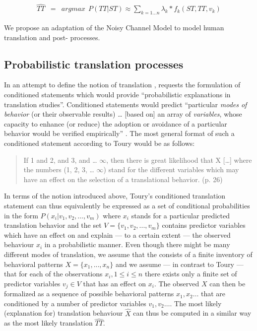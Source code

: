 \documentclass[output=paper]{LSP/langsci}
\begin{document}
\begin{eqnarray}
\label{carl-schaeffer:eqn:loglin}
\widehat {TT} & = & argmax~~P(TT|ST) \approx \sum_{k=1 \ldots n} \lambda_k * f_k(ST, TT,v_k) 
\end{eqnarray}

We propose an adaptation of the Noisy Channel Model to model human translation and post- processes. 

\subsection{Probabilistic translation processes}
\label{carl-schaeffer:sec:2.1}

In an attempt to define the notion of translation , \citet{Toury2004} requests the formulation of conditioned statements which would provide ``probabilistic explanations in translation studies''. Conditioned statements would predict ``particular \textit{modes of behavior }(or their observable results) {\dots} [based on] an array of \textit{variables}, whose capacity to enhance (or reduce) the adoption or avoidance of a particular behavior would be verified empirically'' \citep[24]{Toury2004}. The most general format of such a conditioned statement according to Toury would be as follows:

\begin{quote}
If 1 and 2, and 3, and {\dots} ${\infty}$, then there is great likelihood that X [\dots]
where the numbers (1, 2, 3, {\dots} ${\infty}$) stand for the different variables which may have an effect on the selection of a translational behavior. (p. 26)
\end{quote}

In terms of the notion introduced above, Toury's conditioned translation statement can thus equivalently be expressed as a set of conditional probabilities in the form  $P(x_i | v_1,v_2,{\dots},v_m)$ where $x_i$ stands for a particular predicted translation behavior and the set $V = \{v_1,v_2,...,v_m\}$ contains predictor variables which have an effect on and explain --- to a certain extent --- the observed behaviour $x_i$ in a probabilistic manner. Even though there might be many different modes of translation, we assume that the  consists of a finite inventory of behavioral patterns $X = \{x_1,...,x_n\}$ and we assume --- in contrast to Toury --- that for each of the observations $x_i,1{\leq}i{\leq}n$ there exists only a finite set of predictor variables  $v_j \in V$ that has an effect on  $x_i$. The observed   $X$ can then be formalized as a sequence of possible behavioral patterns $x_1, x_2 \dots$ that are conditioned by a number of predictor variables $v_1, v_2 \dots$. The most likely (explanation for) translation behaviour  $\widehat{X}$ can thus be computed in a similar way as the most likely translation  $\widehat{TT}$.
\end{document}
